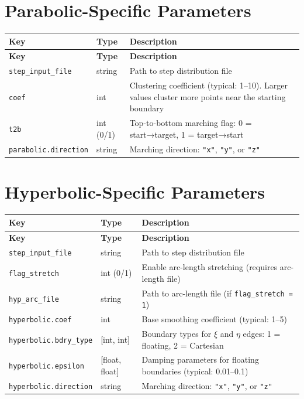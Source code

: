 \documentclass[11pt,a4paper]{report}
\begin{document}
\section{Parabolic-Specific Parameters}

\begin{longtable}{llp{7cm}}
\toprule
\textbf{Key} & \textbf{Type} & \textbf{Description} \\
\midrule
\endfirsthead
\toprule
\textbf{Key} & \textbf{Type} & \textbf{Description} \\
\midrule
\endhead
\bottomrule
\endlastfoot
\texttt{step\_input\_file} & string & Path to step distribution file \\
\texttt{coef} & int & Clustering coefficient (typical: 1--10). Larger values cluster more points near the starting boundary \\
\texttt{t2b} & int (0/1) & Top-to-bottom marching flag: 0 = start→target, 1 = target→start \\
\texttt{parabolic.direction} & string & Marching direction: \texttt{"x"}, \texttt{"y"}, or \texttt{"z"} \\
\end{longtable}

\section{Hyperbolic-Specific Parameters}

\begin{longtable}{llp{7cm}}
\toprule
\textbf{Key} & \textbf{Type} & \textbf{Description} \\
\midrule
\endfirsthead
\toprule
\textbf{Key} & \textbf{Type} & \textbf{Description} \\
\midrule
\endhead
\bottomrule
\endlastfoot
\texttt{step\_input\_file} & string & Path to step distribution file \\
\texttt{flag\_stretch} & int (0/1) & Enable arc-length stretching (requires arc-length file) \\
\texttt{hyp\_arc\_file} & string & Path to arc-length file (if \texttt{flag\_stretch = 1}) \\
\texttt{hyperbolic.coef} & int & Base smoothing coefficient (typical: 1--5) \\
\texttt{hyperbolic.bdry\_type} & [int, int] & Boundary types for $\xi$ and $\eta$ edges: 1 = floating, 2 = Cartesian \\
\texttt{hyperbolic.epsilon} & [float, float] & Damping parameters for floating boundaries (typical: 0.01--0.1) \\
\texttt{hyperbolic.direction} & string & Marching direction: \texttt{"x"}, \texttt{"y"}, or \texttt{"z"} \\
\end{longtable}
\end{document}
